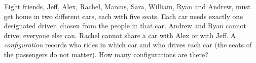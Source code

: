 Eight friends, Jeff, Alex, Rachel, Marcus, Sara, William, Ryan and Andrew, must get home in two different cars, each with five seats. Each car needs exactly one designated driver, chosen from the people in that car. Andrew and Ryan cannot drive; everyone else can. Rachel cannot share a car with Alex or with Jeff. A \emph{configuration} records who rides in which car and who drives each car (the seats of the passengers do not matter). How many configurations are there?

